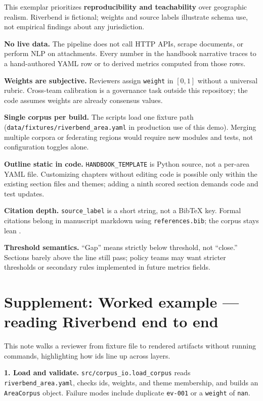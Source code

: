 \documentclass[
]{article}
\begin{document}
This exemplar prioritizes \textbf{reproducibility and teachability} over
geographic realism. Riverbend is fictional; weights and source labels
illustrate schema use, not empirical findings about any jurisdiction.

\textbf{No live data.} The pipeline does not call HTTP APIs, scrape
documents, or perform NLP on attachments. Every number in the handbook
narrative traces to a hand-authored YAML row or to derived metrics
computed from those rows.

\textbf{Weights are subjective.} Reviewers assign \texttt{weight} in
\([0,1]\) without a universal rubric. Cross-team calibration is a
governance task outside this repository; the code assumes weights are
already consensus values.

\textbf{Single corpus per build.} The scripts load one fixture path
(\texttt{data/fixtures/riverbend\_area.yaml} in production use of this
demo). Merging multiple corpora or federating regions would require new
modules and tests, not configuration toggles alone.

\textbf{Outline static in code.} \texttt{HANDBOOK\_TEMPLATE} is Python
source, not a per-area YAML file. Customizing chapters without editing
code is possible only within the existing section files and themes;
adding a ninth scored section demands code and test updates.

\textbf{Citation depth.} \texttt{source\_label} is a short string, not a
BibTeX key. Formal citations belong in manuscript markdown using
\texttt{references.bib}; the corpus stays lean \citep{bowker2005}.

\textbf{Threshold semantics.} ``Gap'' means strictly below threshold,
not ``close.'' Sections barely above the line still pass; policy teams
may want stricter thresholds or secondary rules implemented in future
metrics fields.

\newpage

\section{Supplement: Worked example --- reading Riverbend end to
end}\label{supplement-worked-example-reading-riverbend-end-to-end}

This note walks a reviewer from fixture file to rendered artifacts
without running commands, highlighting how ids line up across layers.

\textbf{1. Load and validate.} \texttt{src/corpus\_io.load\_corpus}
reads \texttt{riverbend\_area.yaml}, checks ids, weights, and theme
membership, and builds an \texttt{AreaCorpus} object. Failure modes
include duplicate \texttt{ev-001} or a \texttt{weight} of \texttt{nan}.
\end{document}
